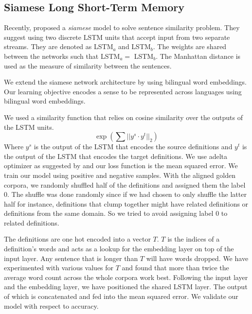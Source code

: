 \subsection{Siamese Long Short-Term Memory}%
\label{sub:siamese_long_short_term_memory}

Recently, \textcite{mueller_siamese_2016} proposed a \emph{siamese} model to solve sentence similarity problem.
They suggest using two discrete LSTM units that accept input from two separate streams.
They are denoted as LSTM$_a$ and LSTM$_b$.
The weights are shared between the networks such that LSTM$_a = $ LSTM$_b$.
The Manhattan distance is used as the measure of similarity between the sentences.

We extend the siamese network architecture by using bilingual word embeddings.
Our learning objective encodes a sense to be represented across languages using bilingual word embeddings.

We used a similarity function that relies on cosine similarity over the outputs of the LSTM units.
\begin{equation}
    \exp(\sum{||y^{s}\cdot y^{t}}||_2)
\end{equation}
Where $y^{s}$ is the output of the LSTM that encodes the source definitions and $y^{t}$ is the output of the LSTM that encodes the target definitions.
We use adelta optimizer as suggested by \textcite{zeiler_adadelta_2012} and our loss function is the mean squared error.
We train our model using positive and negative samples.
With the aligned golden corpora, we randomly shuffled half of the definitions and assigned them the label 0.
The shuffle was done randomly since if we had chosen to only shuffle the latter half for instance, definitions that clump together might have related definitions or definitions from the same domain.
So we tried to avoid assigning label 0 to related definitions.

The definitions are one hot encoded into a vector $T$.
$T$ is the indices of a definition's words and acts as a lookup for the embedding layer on top of the input layer.
Any sentence that is longer than $T$ will have words dropped.
We have experimented with various values for $T$ and found that more than twice the average word count across the whole corpora work best.
Following the input layer and the embedding layer, we have positioned the shared LSTM layer.
The output of which is concatenated and fed into the mean squared error.
We validate our model with respect to accuracy.
